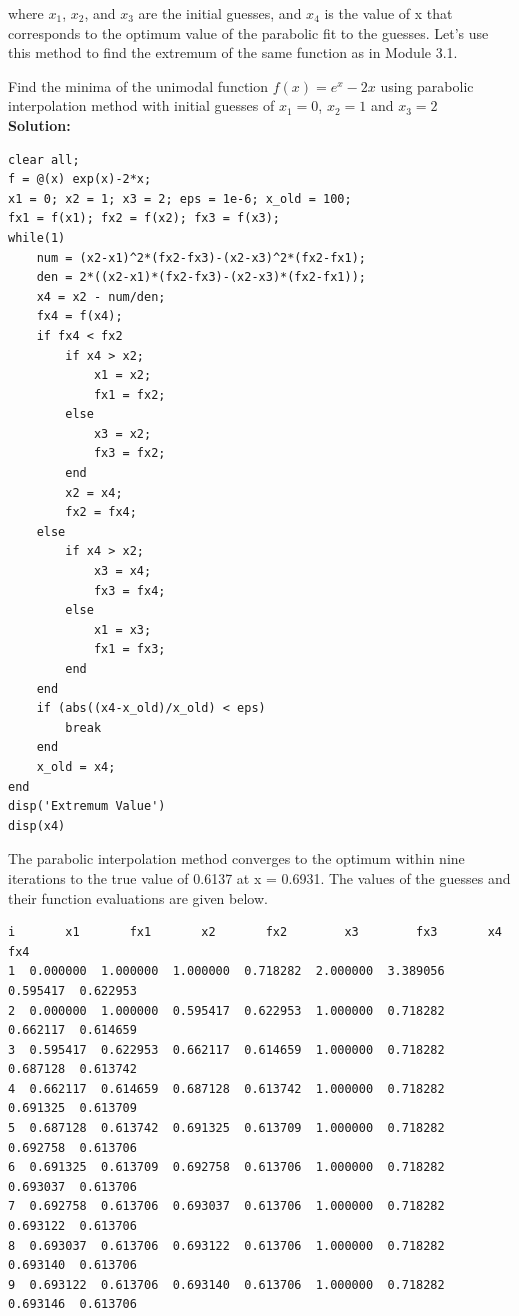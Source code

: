\documentclass[book.tex]{subfiles}
\begin{document}
where $x_1$, $x_2$, and $x_3$ are the initial guesses, and $x_4$ is the value of x that corresponds to the optimum value of the parabolic fit to the guesses. Let's use this method to find the extremum of the same function as in Module 3.1.\\
\begin{example}
Find the minima of the unimodal function $f(x) = e^x-2x$ using parabolic interpolation method with initial guesses of $x_1 = 0$, $x_2 = 1$ and $x_3 = 2$\\
\textbf{Solution: }
\begin{fullwidth}
	\begin{Verbatim}
clear all;
f = @(x) exp(x)-2*x;
x1 = 0; x2 = 1; x3 = 2; eps = 1e-6; x_old = 100;
fx1 = f(x1); fx2 = f(x2); fx3 = f(x3);
while(1)
	num = (x2-x1)^2*(fx2-fx3)-(x2-x3)^2*(fx2-fx1);
	den = 2*((x2-x1)*(fx2-fx3)-(x2-x3)*(fx2-fx1));
	x4 = x2 - num/den;
	fx4 = f(x4);
	if fx4 < fx2
		if x4 > x2;
			x1 = x2;
			fx1 = fx2;
		else
			x3 = x2;
			fx3 = fx2;
		end
		x2 = x4;
		fx2 = fx4;
	else
		if x4 > x2;
			x3 = x4;
			fx3 = fx4;
		else
			x1 = x3;
			fx1 = fx3;
		end
	end
	if (abs((x4-x_old)/x_old) < eps)
		break
	end
	x_old = x4;
end
disp('Extremum Value')
disp(x4)
\end{Verbatim}
\end{fullwidth}
\end{example}
    
The parabolic interpolation method converges to the optimum within nine iterations to the true value of 0.6137 at x = 0.6931. The values of the guesses and their function evaluations are given below.
\begin{fullwidth}
	\begin{Verbatim}
i       x1       fx1       x2       fx2        x3        fx3       x4        fx4
1  0.000000  1.000000  1.000000  0.718282  2.000000  3.389056  0.595417  0.622953
2  0.000000  1.000000  0.595417  0.622953  1.000000  0.718282  0.662117  0.614659
3  0.595417  0.622953  0.662117  0.614659  1.000000  0.718282  0.687128  0.613742
4  0.662117  0.614659  0.687128  0.613742  1.000000  0.718282  0.691325  0.613709
5  0.687128  0.613742  0.691325  0.613709  1.000000  0.718282  0.692758  0.613706
6  0.691325  0.613709  0.692758  0.613706  1.000000  0.718282  0.693037  0.613706
7  0.692758  0.613706  0.693037  0.613706  1.000000  0.718282  0.693122  0.613706
8  0.693037  0.613706  0.693122  0.613706  1.000000  0.718282  0.693140  0.613706
9  0.693122  0.613706  0.693140  0.613706  1.000000  0.718282  0.693146  0.613706

\end{Verbatim}
\end{fullwidth}
\end{document}
